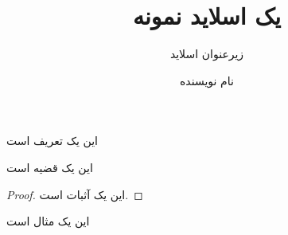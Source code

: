 \documentclass{beamer}
\title{یک اسلاید نمونه}
\subtitle{زیرعنوان اسلاید}
\author{نام نویسنده}
\begin{document}
	\frame{\maketitle}
	\begin{frame}
	\ptext[1]
	\begin{definition}
		این یک تعریف است
	\end{definition}
	\begin{theorem}
		این یک قضیه است
	\end{theorem}
	
	\begin{proof}
		این یک آثبات است.
	\end{proof}
	
	\begin{example}
		این یک مثال است
	\end{example}
\end{frame}
\end{document}
